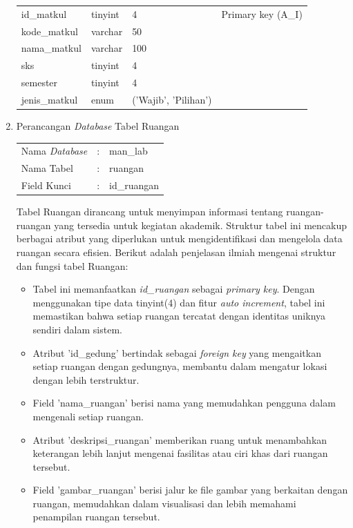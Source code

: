 \begin{enumerate}
{\begin{longtable}{l l l l}
				      id\_matkul              & tinyint                & 4                        & Primary key (A\_I)    \\
				      kode\_matkul            & varchar                & 50                       &                       \\
				      nama\_matkul            & varchar                & 100                      &                       \\
				      sks                     & tinyint                & 4                        &                       \\
				      semester                & tinyint                & 4                        &                       \\
				      jenis\_matkul           & enum                   & ('Wajib', 'Pilihan')     &                       \\
				      \hline
			      \end{longtable}
		      }

	\item Perancangan \textit{Database} Tabel Ruangan \\
	      \begin{tabular}{lll}
		      Nama \textit{Database} & : & man\_lab    \\
		      Nama Tabel             & : & ruangan     \\
		      Field Kunci            & : & id\_ruangan \\
	      \end{tabular}

	      Tabel Ruangan dirancang untuk menyimpan informasi tentang ruangan-ruangan yang tersedia untuk kegiatan akademik. Struktur tabel ini mencakup berbagai atribut yang diperlukan untuk mengidentifikasi dan mengelola data ruangan secara efisien. Berikut adalah penjelasan ilmiah mengenai struktur dan fungsi tabel Ruangan:

	      \begin{itemize}
		      \item Tabel ini memanfaatkan \textit{id\_ruangan} sebagai \textit{primary key}. Dengan menggunakan tipe data tinyint(4) dan fitur \textit{auto increment}, tabel ini memastikan bahwa setiap ruangan tercatat dengan identitas uniknya sendiri dalam sistem.
		      \item Atribut 'id\_gedung' bertindak sebagai \textit{foreign key} yang mengaitkan setiap ruangan dengan gedungnya, membantu dalam mengatur lokasi dengan lebih terstruktur.
		      \item Field 'nama\_ruangan' berisi nama yang memudahkan pengguna dalam mengenali setiap ruangan.
		      \item Atribut 'deskripsi\_ruangan' memberikan ruang untuk menambahkan keterangan lebih lanjut mengenai fasilitas atau ciri khas dari ruangan tersebut.
		      \item Field 'gambar\_ruangan' berisi jalur ke file gambar yang berkaitan dengan ruangan, memudahkan dalam visualisasi dan lebih memahami penampilan ruangan tersebut.
	      \end{itemize}


\end{enumerate}
